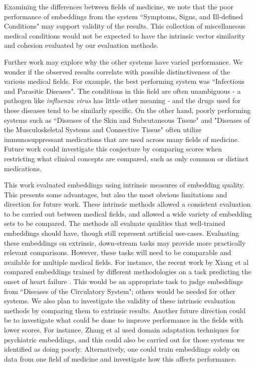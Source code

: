 \documentclass[11pt,a4paper]{article}
\begin{document}
Examining the differences between fields of medicine, we note that the poor performance of embeddings from the system ``Symptoms, Signs, and Ill-defined Conditions" may support validity of the results. This collection of miscellaneous medical conditions would not be expected to have the intrinsic vector similarity and cohesion evaluated by our evaluation methods.   

Further work may explore why the other systems have varied performance. We wonder if the observed results correlate with possible distinctiveness of the various medical fields. For example, the best performing system was ``Infectious and Parasitic Diseases". The conditions in this field are often unambiguous - a pathogen like \emph{influenza virus} has little other meaning - and the drugs used for these diseases tend to be similarly specific. On the other hand,  poorly performing systems such as ``Diseases of the Skin and Subcutaneous Tissue" and "Diseases of the Musculoskeletal Systems and Connective Tissue" often utilize immunosuppressant medications that are used across many fields of medicine. Future work could investigate this conjecture by comparing scores when restricting what clinical concepts are compared, such as only common or distinct medications. 

This work evaluated embeddings using intrinsic measures of embedding quality. This presents some advantages, but also the most obvious limitations and direction for future work. These intrinsic methods allowed a consistent evaluation to be carried out between medical fields, and allowed a wide variety of embedding sets to be compared. The methods all evaluate qualities that well-trained embeddings should have, though still represent artificial use-cases. Evaluating these embeddings on extrinsic, down-stream tasks may provide more practically relevant comparisons. However, these tasks will need to be comparable and available for multiple medical fields. For instance, the recent work by Xiang et al  compared embeddings trained by different methodologies on a task predicting the onset of heart failure \cite{rasmyStudyGeneralizabilityRecurrent2018}. This would be an appropriate task to judge embeddings from ``Diseases of the Circulatory System";  others would be needed for other systems. We also plan to investigate the validity of these intrinsic evaluation methods by comparing them to extrinsic results. 
\newpage
Another future direction could be to investigate what could be done to improve performance in the fields with lower scores. For instance, Zhang et al  used domain adaptation techniques for psychiatric embeddings, and this could also be carried out for those systems we identified as doing poorly. Alternatively, one could train embeddings solely on data from one field of medicine and investigate how this affects performance. 
\end{document}
